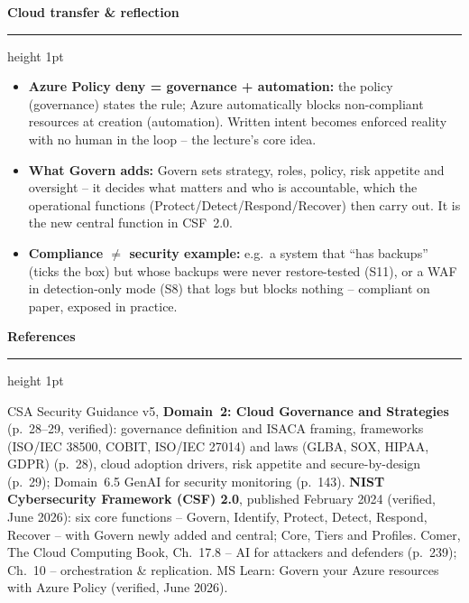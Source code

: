 \documentclass[11pt]{article}
\newcommand{\wbsection}[1]{\par\vspace{11pt}\noindent
  {\large\bfseries\color{kred}#1}\par\vspace{2pt}
  {\color{kred!35}\hrule height 1pt}\par\vspace{6pt}}
\renewcommand{\emph}[1]{\textup{#1}}
\begin{document}
\wbsection{Cloud transfer \& reflection}
\begin{itemize}
\item \textbf{Azure Policy deny = governance + automation:} the \emph{policy} (governance) states the
      rule; Azure \emph{automatically} blocks non-compliant resources at creation (automation). Written
      intent becomes enforced reality with no human in the loop -- the lecture's core idea.
\item \textbf{What Govern adds:} Govern sets strategy, roles, policy, risk appetite and oversight -- it
      decides \emph{what} matters and \emph{who} is accountable, which the operational functions
      (Protect/Detect/Respond/Recover) then carry out. It is the new central function in CSF~2.0.
\item \textbf{Compliance $\ne$ security example:} e.g.\ a system that ``has backups'' (ticks the box) but
      whose backups were never restore-tested (S11), or a WAF in detection-only mode (S8) that logs but
      blocks nothing -- compliant on paper, exposed in practice.
\end{itemize}

\wbsection{References}
CSA Security Guidance v5, \textbf{Domain~2: Cloud Governance and Strategies} (p.~28--29, verified):
governance definition and ISACA framing, frameworks (ISO/IEC 38500, COBIT, ISO/IEC 27014) and laws
(GLBA, SOX, HIPAA, GDPR) (p.~28), cloud adoption drivers, risk appetite and secure-by-design (p.~29);
Domain~6.5 GenAI for security monitoring (p.~143). \textbf{NIST Cybersecurity Framework (CSF) 2.0},
published February 2024 (verified, June 2026): six core functions -- Govern, Identify, Protect, Detect,
Respond, Recover -- with Govern newly added and central; Core, Tiers and Profiles. Comer, \emph{The Cloud
Computing Book}, Ch.~17.8 -- AI for attackers and defenders (p.~239); Ch.~10 -- orchestration \&
replication. MS Learn: \emph{Govern your Azure resources with Azure Policy} (verified, June 2026).
\end{document}
